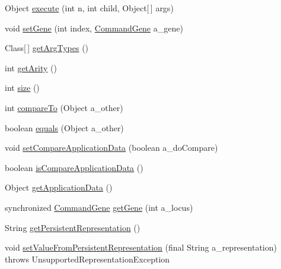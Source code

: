 \begin{DoxyCompactItemize}
Object \hyperlink{classorg_1_1jgap_1_1gp_1_1impl_1_1_program_chromosome_a376d8beedfc62a18b9d105d280cc141d}{execute} (int n, int child, Object\mbox{[}$\,$\mbox{]} args)
\item 
void \hyperlink{classorg_1_1jgap_1_1gp_1_1impl_1_1_program_chromosome_a705e4148b5d42c772bab87068287b8bf}{set\-Gene} (int index, \hyperlink{classorg_1_1jgap_1_1gp_1_1_command_gene}{Command\-Gene} a\-\_\-gene)
\item 
Class\mbox{[}$\,$\mbox{]} \hyperlink{classorg_1_1jgap_1_1gp_1_1impl_1_1_program_chromosome_a96b8adcf50530c6bfbadda604b57314f}{get\-Arg\-Types} ()
\item 
int \hyperlink{classorg_1_1jgap_1_1gp_1_1impl_1_1_program_chromosome_a1873ffcdf7eaaf635b85b70f5a4ac59a}{get\-Arity} ()
\item 
int \hyperlink{classorg_1_1jgap_1_1gp_1_1impl_1_1_program_chromosome_ade35d12aa45f98f2acea90b52bda3375}{size} ()
\item 
int \hyperlink{classorg_1_1jgap_1_1gp_1_1impl_1_1_program_chromosome_ac9896e142c28c71711133698041fb72f}{compare\-To} (Object a\-\_\-other)
\item 
boolean \hyperlink{classorg_1_1jgap_1_1gp_1_1impl_1_1_program_chromosome_a39b343e4b3d1e851adef34ec081814ee}{equals} (Object a\-\_\-other)
\item 
void \hyperlink{classorg_1_1jgap_1_1gp_1_1impl_1_1_program_chromosome_afdecb0a33331b2ecef9be73815f72ef1}{set\-Compare\-Application\-Data} (boolean a\-\_\-do\-Compare)
\item 
boolean \hyperlink{classorg_1_1jgap_1_1gp_1_1impl_1_1_program_chromosome_a24c91c7e53c8ad7be9d7badee0d1aad5}{is\-Compare\-Application\-Data} ()
\item 
Object \hyperlink{classorg_1_1jgap_1_1gp_1_1impl_1_1_program_chromosome_a34507350def1243e665819c4914738f9}{get\-Application\-Data} ()
\item 
synchronized \hyperlink{classorg_1_1jgap_1_1gp_1_1_command_gene}{Command\-Gene} \hyperlink{classorg_1_1jgap_1_1gp_1_1impl_1_1_program_chromosome_a0204f8ead0682a3210428c6291456be7}{get\-Gene} (int a\-\_\-locus)
\item 
String \hyperlink{classorg_1_1jgap_1_1gp_1_1impl_1_1_program_chromosome_a6536e99f35877cb53ef5d01ea0c786be}{get\-Persistent\-Representation} ()
\item 
void \hyperlink{classorg_1_1jgap_1_1gp_1_1impl_1_1_program_chromosome_a2ea8008dc2f1662945564f8d0ee67c82}{set\-Value\-From\-Persistent\-Representation} (final String a\-\_\-representation)  throws Unsupported\-Representation\-Exception 

\end{DoxyCompactItemize}
